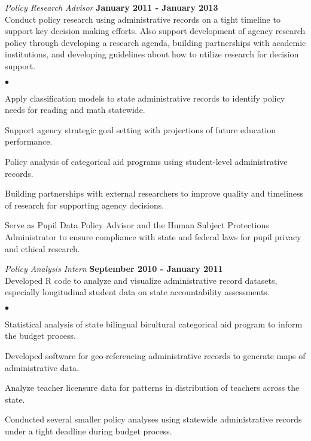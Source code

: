 \documentclass[margin,line]{res}
\newenvironment{list2}{
  \begin{list}{$\bullet$}{%
      \setlength{\itemsep}{0in}
      \setlength{\parsep}{0in} \setlength{\parskip}{0in}
      \setlength{\topsep}{0in} \setlength{\partopsep}{0in} 
      \setlength{\leftmargin}{0.2in}}}{\end{list}}
\begin{document}
\begin{resume}
\vspace{-.3cm}
{\em Policy Research Advisor} \hfill {\bf January 2011 - January 2013}\\
Conduct policy research using administrative records on a tight timeline to support key decision making efforts. Also support development of agency research policy through developing a research agenda, building partnerships with academic institutions, and developing guidelines about how to utilize research for decision support.
\begin{list2}
\item Apply classification models to state administrative records to identify policy needs for reading and math statewide.
\item Support agency strategic goal setting with projections of future education performance.
\item Policy analysis of categorical aid programs using student-level administrative records.
\item Building partnerships with external researchers to improve quality and timeliness of research for supporting agency decisions.
\item Serve as Pupil Data Policy Advisor and the Human Subject Protections Administrator to ensure compliance with state and federal laws for pupil privacy and ethical research.
\end{list2}

\vspace{-.3cm}
{\em Policy Analysis Intern} \hfill {\bf September 2010 - January 2011}\\
Developed R code to analyze and visualize administrative record datasets, especially longitudinal student data on state accountability assessments. 
\begin{list2}
\item Statistical analysis of state bilingual bicultural categorical aid program to inform the budget process.
\item Developed software for geo-referencing administrative records to generate maps of administrative data.
\item Analyze teacher licensure data for patterns in distribution of teachers across the state.
\item Conducted several smaller policy analyses using statewide administrative records under a tight deadline during budget process.
\end{list2}


\end{resume}
\end{document}
